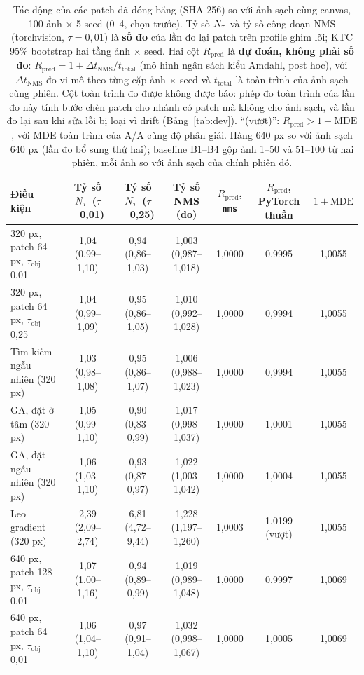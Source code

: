 \begin{table}[t]
\centering\small
\caption{Tác động của các patch đã đóng băng (SHA-256) so với ảnh sạch cùng canvas, 100 ảnh $\times$ 5 seed (0--4, chọn trước). Tỷ số $N_{\tau}$ và tỷ số công đoạn NMS (torchvision, $\tau=0{,}01$) là \textbf{số đo} của lần đo lại patch trên profile ghim lõi; KTC 95\% bootstrap hai tầng ảnh $\times$ seed. Hai cột $R_{\mathrm{pred}}$ là \textbf{dự đoán, không phải số đo}: $R_{\mathrm{pred}} = 1 + \Delta t_{\mathrm{NMS}}/t_{\mathrm{total}}$ (mô hình ngân sách kiểu Amdahl, post hoc), với $\Delta t_{\mathrm{NMS}}$ đo vi mô theo từng cặp ảnh $\times$ seed và $t_{\mathrm{total}}$ là toàn trình của ảnh sạch cùng phiên. Cột toàn trình đo được không được báo: phép đo toàn trình của lần đo này tính bước chèn patch cho nhánh có patch mà không cho ảnh sạch, và lần đo lại sau khi sửa lỗi bị loại vì drift (Bảng~\ref{tab:dev}). ``(vượt)'': $R_{\mathrm{pred}} > 1+\mathrm{MDE}$, với MDE toàn trình của A/A cùng độ phân giải. Hàng 640 px so với ảnh sạch 640 px (lần đo bổ sung thứ hai); baseline B1--B4 gộp ảnh 1--50 và 51--100 từ hai phiên, mỗi ảnh so với ảnh sạch của chính phiên đó.}
\label{tab:patches}
\begin{tabular}{@{}lcccccc@{}}
\toprule
Điều kiện & Tỷ số $N_{\tau}$ ($\tau$=0,01) & Tỷ số $N_{\tau}$ ($\tau$=0,25) & Tỷ số NMS (đo) & $R_{\mathrm{pred}}$, \texttt{nms} & $R_{\mathrm{pred}}$, PyTorch thuần & $1+\mathrm{MDE}$ \\
\midrule
320 px, patch 64 px, $\tau_{\mathrm{obj}}$ 0,01 & 1,04 (0,99--1,10) & 0,94 (0,86--1,03) & 1,003 (0,987--1,018) & 1,0000 & 0,9995 & 1,0055 \\
320 px, patch 64 px, $\tau_{\mathrm{obj}}$ 0,25 & 1,04 (0,99--1,09) & 0,95 (0,86--1,05) & 1,010 (0,992--1,028) & 1,0000 & 0,9994 & 1,0055 \\
Tìm kiếm ngẫu nhiên (320 px) & 1,03 (0,98--1,08) & 0,95 (0,86--1,07) & 1,006 (0,988--1,023) & 1,0000 & 0,9994 & 1,0055 \\
GA, đặt ở tâm (320 px) & 1,05 (0,99--1,10) & 0,90 (0,83--0,99) & 1,017 (0,998--1,037) & 1,0000 & 1,0001 & 1,0055 \\
GA, đặt ngẫu nhiên (320 px) & 1,06 (1,03--1,10) & 0,93 (0,87--0,97) & 1,022 (1,003--1,042) & 1,0000 & 1,0004 & 1,0055 \\
Leo gradient (320 px) & 2,39 (2,09--2,74) & 6,81 (4,72--9,44) & 1,228 (1,197--1,260) & 1,0003 & 1,0199 (vượt) & 1,0055 \\
640 px, patch 128 px, $\tau_{\mathrm{obj}}$ 0,01 & 1,07 (1,00--1,16) & 0,94 (0,89--0,99) & 1,019 (0,989--1,048) & 1,0000 & 0,9997 & 1,0069 \\
640 px, patch 64 px, $\tau_{\mathrm{obj}}$ 0,01 & 1,06 (1,04--1,10) & 0,97 (0,91--1,04) & 1,032 (0,998--1,067) & 1,0000 & 1,0005 & 1,0069 \\
\bottomrule
\end{tabular}
\end{table}
